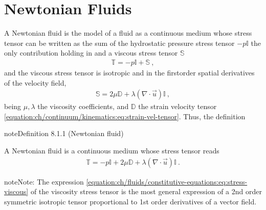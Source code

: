 \documentclass[letterpaper,10pt,english]{jupyterBook}
\begin{document}
\section{Newtonian Fluids}
\label{\detokenize{ch/fluids/constitutive-equations:newtonian-fluids}}\label{\detokenize{ch/fluids/constitutive-equations:fluid-mechanics-constutive-equations-newtonian}}
\sphinxAtStartPar
A Newtonian fluid is the model of a fluid as a continuous medium whose stress tensor can be written as the sum of the hydrostatic pressure stress tensor \(-p \mathbb{I}\) \sphinxhyphen{} the only contribution holding in {\hyperref[\detokenize{ch/fluids/statics:fluid-mechanics-statics}]{}} \sphinxhyphen{} and a viscous stress tensor \(\mathbb{S}\)
\begin{equation*}
\begin{split}\mathbb{T} = -p \mathbb{I} + \mathbb{S} \ ,\end{split}
\end{equation*}
\sphinxAtStartPar
and the viscous stress tensor is isotropic and  in the first\sphinxhyphen{}order spatial derivatives of the velocity field,
\begin{equation}\label{equation:ch/fluids/constitutive-equations:eq:stress-viscous}
\begin{split}\mathbb{S} = 2 \mu \mathbb{D} + \lambda (\nabla \cdot \vec{u}) \mathbb{I} \ ,\end{split}
\end{equation}
\sphinxAtStartPar
being \(\mu, \lambda\) the viscosity coefficients, and \(\mathbb{D}\) the strain velocity tensor \eqref{equation:ch/continuum/kinematics:eq:strain-vel-tensor}. Thus, the definition
\label{ch/fluids/constitutive-equations:definition-0}
\begin{sphinxadmonition}{note}{Definition 8.1.1 (Newtonian fluid)}



\sphinxAtStartPar
A Newtonian fluid is a continuous medium whose stress tensor reads
\begin{equation}\label{equation:ch/fluids/constitutive-equations:eq:stress-newtonian}
\begin{split}\mathbb{T} = - p \mathbb{I} + 2 \mu \mathbb{D} + \lambda (\nabla \cdot \vec{u}) \mathbb{I} \ .\end{split}
\end{equation}\end{sphinxadmonition}

\begin{sphinxadmonition}{note}{Note:}
\sphinxAtStartPar
The expression \eqref{equation:ch/fluids/constitutive-equations:eq:stress-viscous} of the viscosity stress tensor is the most general expression of a 2\sphinxhyphen{}nd order symmetric isotropic tensor proportional to 1\sphinxhyphen{}st order derivatives of a vector field.
\end{sphinxadmonition}
\end{document}
